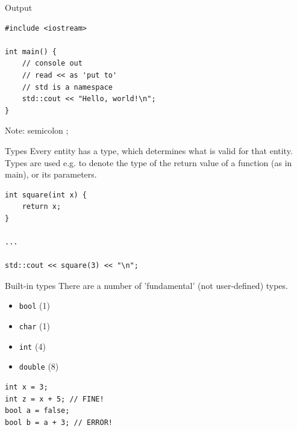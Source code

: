 \documentclass[10pt]{beamer}
\begin{document}
\begin{frame}[fragile,label={sec:orgaa22d8a}]{Output}
 \begin{verbatim}
#include <iostream>

int main() {
    // console out
    // read << as 'put to'
    // std is a namespace
    std::cout << "Hello, world!\n";
}
\end{verbatim}

Note: \alert{semicolon} ;
\end{frame}

\begin{frame}[fragile,label={sec:org091f275}]{Types}
 Every entity has a type, which determines what is valid for that entity. Types are used e.g. to denote the type of the return value of a function (as in main), or its parameters.

\begin{verbatim}
int square(int x) {
    return x;
}

...

std::cout << square(3) << "\n";
\end{verbatim}
\end{frame}

\begin{frame}[fragile,label={sec:orgfc444f9}]{Built-in types}
 There are a number of 'fundamental' (not user-defined) types.

\begin{itemize}
\item \texttt{bool} (1)
\item \texttt{char} (1)
\item \texttt{int} (4)
\item \texttt{double} (8)
\end{itemize}

\begin{verbatim}
int x = 3;
int z = x + 5; // FINE!
bool a = false;
bool b = a + 3; // ERROR!
\end{verbatim}
\end{frame}
\end{document}

